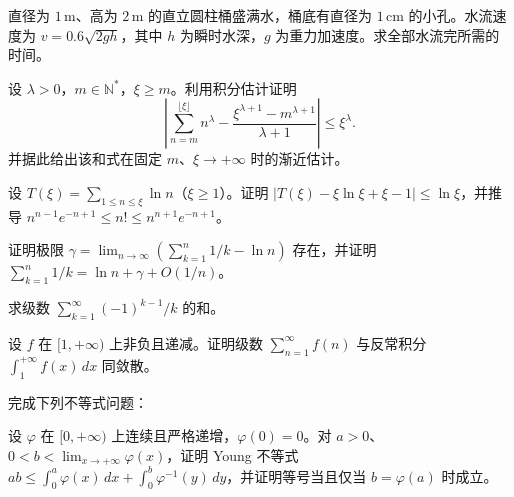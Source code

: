 \newpage
\noindent\begin{minipage}{\textwidth}
直径为 $1\,\mathrm m$、高为 $2\,\mathrm m$ 的直立圆柱桶盛满水，桶底有直径为 $1\,\mathrm{cm}$ 的小孔。水流速度为 $v=0.6\sqrt{2gh}$，其中 $h$ 为瞬时水深，$g$ 为重力加速度。求全部水流完所需的时间。
\end{minipage}\par\vfill
\noindent\begin{minipage}{\textwidth}
设 $\lambda>0$，$m\in\mathbb N^*$，$\xi\ge m$。利用积分估计证明\[\left|\sum_{n=m}^{\lfloor\xi\rfloor}n^\lambda-\frac{\xi^{\lambda+1}-m^{\lambda+1}}{\lambda+1}\right|\le\xi^\lambda.\]并据此给出该和式在固定 $m$、$\xi\to+\infty$ 时的渐近估计。
\end{minipage}\par\vfill
\noindent\begin{minipage}{\textwidth}
设 $T(\xi)=\sum_{1\le n\le\xi}\ln n$（$\xi\ge1$）。证明 $|T(\xi)-\xi\ln\xi+\xi-1|\le\ln\xi$，并推导 $n^{n-1}e^{-n+1}\le n!\le n^{n+1}e^{-n+1}$。
\end{minipage}\par\vfill
\newpage
\noindent\begin{minipage}{\textwidth}
证明极限 $\gamma=\lim_{n\to\infty}(\sum_{k=1}^n1/k-\ln n)$ 存在，并证明 $\sum_{k=1}^n1/k=\ln n+\gamma+O(1/n)$。
\end{minipage}\par\vfill
\noindent\begin{minipage}{\textwidth}
求级数 $\sum_{k=1}^{\infty}(-1)^{k-1}/k$ 的和。
\end{minipage}\par\vfill
\noindent\begin{minipage}{\textwidth}
设 $f$ 在 $[1,+\infty)$ 上非负且递减。证明级数 $\sum_{n=1}^{\infty}f(n)$ 与反常积分 $\int_1^{+\infty}f(x)\,dx$ 同敛散。
\end{minipage}\par\vfill
\newpage
\noindent\begin{minipage}{\textwidth}
完成下列不等式问题：
\end{minipage}\par\vfill
\noindent\begin{minipage}{\textwidth}
设 $\varphi$ 在 $[0,+\infty)$ 上连续且严格递增，$\varphi(0)=0$。对 $a>0$、$0<b<\lim_{x\to+\infty}\varphi(x)$，证明 Young 不等式 $ab\le\int_0^a\varphi(x)\,dx+\int_0^b\varphi^{-1}(y)\,dy$，并证明等号当且仅当 $b=\varphi(a)$ 时成立。
\end{minipage}\par\vfill
